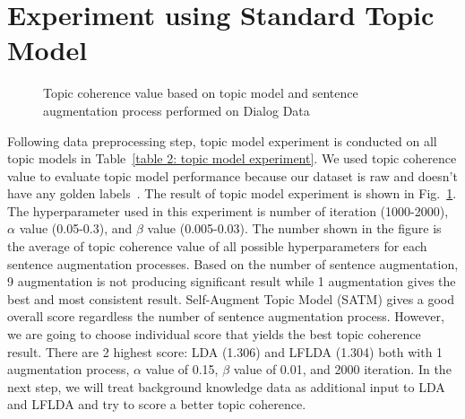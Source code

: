 \documentclass[senior]{IPSstyle}
\begin{document}
\section{Experiment using Standard Topic Model}
\begin{figure}[h]
	\centering
	\caption{Topic coherence value based on topic model and sentence augmentation process performed on Dialog Data}
\label{fig_tme}
\end{figure}

Following data preprocessing step, topic model experiment is conducted on all topic models in Table~\ref{table 2: topic model experiment}. We used topic coherence value to evaluate topic model performance because our dataset is raw and doesn’t have any golden labels~\cite{qiang}. The result of topic model experiment is shown in Fig.~\ref{fig_tme}. The hyperparameter used in this experiment is number of iteration (1000-2000), $\alpha$ value (0.05-0.3), and $\beta$ value (0.005-0.03). The number shown in the figure is the average of topic coherence value of all possible hyperparameters for each sentence augmentation processes. Based on the number of sentence augmentation, 9 augmentation is not producing significant result while 1 augmentation gives the best and most consistent result. Self-Augment Topic Model (SATM) gives a good overall score regardless the number of sentence augmentation process. However, we are going to choose individual score that yields the best topic coherence result. There are 2 highest score: LDA (1.306) and LFLDA (1.304) both with 1 augmentation process, $\alpha$ value of 0.15, $\beta$ value of 0.01, and 2000 iteration. In the next step, we will treat background knowledge data as additional input to LDA and LFLDA and try to score a better topic coherence.
\end{document}
